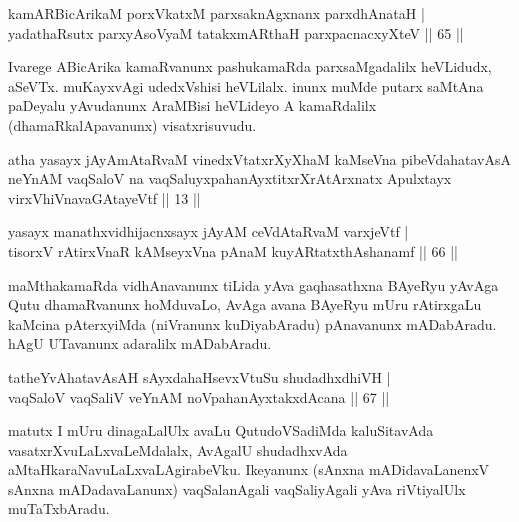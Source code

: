 
\begin{shl}
kamAR\s \s BicArikaM porxVkatxM parxsaknAgxnanx parxdhAnataH | \\
yadathaRsutx parxyAsoV\s yaM tatakxmARthaH parxpacnacxyXteV \hfill|| 65 || 
\end{shl}

\begin{artha}
Ivarege ABicArika kamaRvanunx pashukamaRda parxsaMgadalilx heVLidudx, aSeVTx. muKayxvAgi udedxVshisi heVLilalx. inunx muMde putarx saMtAna paDeyalu yAvudanunx AraMBisi heVLideyo A kamaRdalilx (dhamaRkalApavanunx) visatxrisuvudu.
\end{artha}

\begin{shl}
atha yasayx jAyAmAtaRvaM vinedxVtatxrXyXhaM kaMseVna pibeVdahatavAsA neYnAM vaqSaloV na vaqSaluyxpahanAyxtitxrXrAtArxnatx Apulxtayx virxVhiVnavaGAtayeVtf || 13 ||
\end{shl}

\begin{shl}
yasayx manathxvidhijacnxsayx jAyAM ceVdAtaRvaM varxjeVtf | \\
tisorxV rAtirxVnaR kAMseyxVna pAnaM kuyARtatxthA\s shanamf  \hfill|| 66 || 
\end{shl}

\begin{artha}
maMthakamaRda vidhAnavanunx tiLida yAva gaqhasathxna BAyeRyu yAvAga 
Qutu dhamaRvanunx hoMduvaLo, AvAga avana BAyeRyu mUru rAtirxgaLu 
kaMcina pAterxyiMda (niVranunx kuDiyabAradu) pAnavanunx mADabAradu. 
hAgU UTavanunx adaralilx mADabAradu.
\end{artha}


\begin{shl}
tatheYvAhatavAsAH sAyxdahaHsevxVtuSu shudadhxdhiVH | \\
vaqSaloV vaqSaliV veYnAM noVpahanAyxtakxdAcana \hfill|| 67 || 
\end{shl}

\begin{artha}
matutx I mUru dinagaLalUlx avaLu QutudoVSadiMda kaluSitavAda vasatxrXvuLaLxvaLeMdalalx, AvAgalU shudadhxvAda aMtaHkaraNavuLaLxvaLAgirabeVku. Ikeyanunx (sAnxna mADidavaLanenxV sAnxna mADadavaLanunx) vaqSalanAgali vaqSaliyAgali yAva riVtiyalUlx muTaTxbAradu.
\end{artha}

